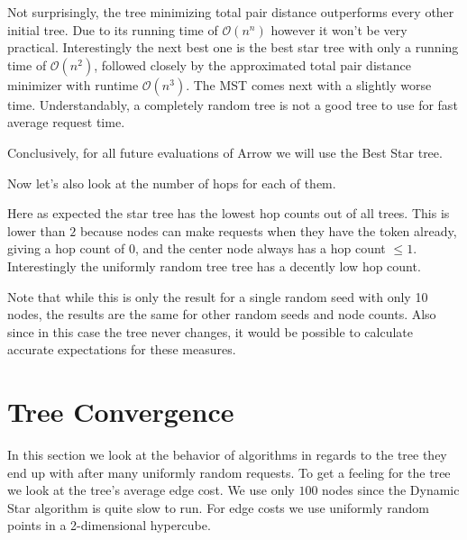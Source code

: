 \documentclass[a4paper, oneside]{discothesis}
\begin{document}
Not surprisingly, the tree minimizing total pair distance outperforms every other initial tree. Due to its running time of $\mathcal{O}(n^n)$ however it won't be very practical. Interestingly the next best one is the best star tree with only a running time of $\mathcal{O}(n^2)$, followed closely by the approximated total pair distance minimizer with runtime $\mathcal{O}(n^3)$. The MST comes next with a slightly worse time. Understandably, a completely random tree is not a good tree to use for fast average request time.

Conclusively, for all future evaluations of Arrow we will use the Best Star tree.

Now let's also look at the number of hops for each of them.


Here as expected the star tree has the lowest hop counts out of all trees. This is lower than $2$ because nodes can make requests when they have the token already, giving a hop count of $0$, and the center node always has a hop count $\leq 1$. Interestingly the uniformly random tree tree has a decently low hop count.

Note that while this is only the result for a single random seed with only 10 nodes, the results are the same for other random seeds and node counts. Also since in this case the tree never changes, it would be possible to calculate accurate expectations for these measures.

\section{Tree Convergence}

In this section we look at the behavior of algorithms in regards to the tree they end up with after many uniformly random requests. To get a feeling for the tree we look at the tree's average edge cost. We use only $100$ nodes since the Dynamic Star algorithm is quite slow to run. For edge costs we use uniformly random points in a 2-dimensional hypercube.
\end{document}
